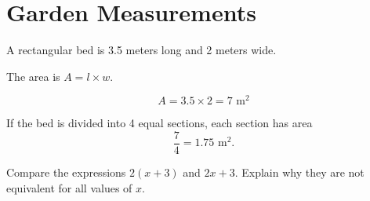 \section{Garden Measurements}
A rectangular bed is 3.5 meters long and 2 meters wide.

The area is \(A = l \times w\).

\[
A = 3.5 \times 2 = 7\text{ m}^2
\]

If the bed is divided into 4 equal sections, each section has area
\[
\frac{7}{4} = 1.75\text{ m}^2.
\]

Compare the expressions \(2(x+3)\) and \(2x+3\). Explain why they are not
equivalent for all values of \(x\).
